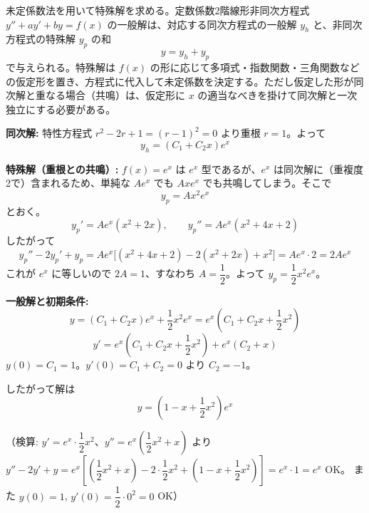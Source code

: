 
未定係数法を用いて特殊解を求める。定数係数2階線形非同次方程式 $y'' + a y' + b y = f(x)$ の一般解は、対応する同次方程式の一般解 $y_h$ と、非同次方程式の特殊解 $y_p$ の和
\[
y = y_h + y_p
\]
で与えられる。特殊解は $f(x)$ の形に応じて多項式・指数関数・三角関数などの仮定形を置き、方程式に代入して未定係数を決定する。ただし仮定した形が同次解と重なる場合（共鳴）は、仮定形に $x$ の適当なべきを掛けて同次解と一次独立にする必要がある。

\medskip
\noindent
\textbf{同次解:} 特性方程式 $r^{2}-2r+1 = (r-1)^{2} = 0$ より重根 $r=1$。よって
\[
y_h = (C_{1}+C_{2}x)e^{x}
\]

\noindent
\textbf{特殊解（重根との共鳴）:} $f(x)=e^{x}$ は $e^{x}$ 型であるが、$e^{x}$ は同次解に（重複度2で）含まれるため、単純な $Ae^x$ でも $Axe^x$ でも共鳴してしまう。そこで
\[
y_p = Ax^{2}e^{x}
\]
とおく。
\[
y_p' = A e^{x}(x^{2}+2x), \qquad y_p'' = A e^{x}(x^{2}+4x+2)
\]
したがって
\[
y_p'' - 2y_p' + y_p = Ae^{x}\bigl[(x^{2}+4x+2) - 2(x^{2}+2x) + x^{2}\bigr] = Ae^{x}\cdot 2 = 2Ae^{x}
\]
これが $e^{x}$ に等しいので $2A=1$、すなわち $A = \dfrac{1}{2}$。よって $y_p = \dfrac{1}{2}x^{2}e^{x}$。

\noindent
\textbf{一般解と初期条件:}
\[
y = (C_{1}+C_{2}x)e^{x} + \frac{1}{2}x^{2}e^{x} = e^{x}\left(C_{1} + C_{2}x + \frac{1}{2}x^{2}\right)
\]
\[
y' = e^{x}\left(C_{1} + C_{2}x + \frac{1}{2}x^{2}\right) + e^{x}(C_{2}+x)
\]
$y(0) = C_{1} = 1$。$y'(0) = C_{1}+C_{2} = 0$ より $C_{2} = -1$。

\noindent
したがって解は
\[
\boxed{\; y = \left(1 - x + \frac{1}{2}x^{2}\right)e^{x} \;}
\]

（検算: $y' = e^x\cdot\dfrac{1}{2}x^2$、$y'' = e^x\left(\dfrac{1}{2}x^2+x\right)$ より
$y''-2y'+y = e^x\left[\left(\dfrac{1}{2}x^2+x\right) - 2\cdot\dfrac{1}{2}x^2 + \left(1-x+\dfrac{1}{2}x^2\right)\right] = e^x\cdot 1 = e^x$ OK。
また $y(0)=1$, $y'(0)=\dfrac{1}{2}\cdot 0^2=0$ OK）
